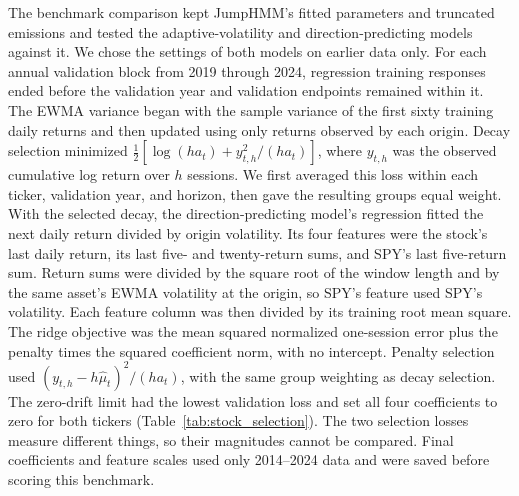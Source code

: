 The benchmark comparison kept JumpHMM's fitted parameters and truncated emissions and tested the adaptive-volatility and direction-predicting models against it. We chose the settings of both models on earlier data only. For each annual validation block from 2019 through 2024, regression training responses ended before the validation year and validation endpoints remained within it. The EWMA variance began with the sample variance of the first sixty training daily returns and then updated using only returns observed by each origin. Decay selection minimized $\tfrac12[\log(h a_t)+y_{t,h}^2/(h a_t)]$, where $y_{t,h}$ was the observed cumulative log return over $h$ sessions. We first averaged this loss within each ticker, validation year, and horizon, then gave the resulting groups equal weight. With the selected decay, the direction-predicting model's regression fitted the next daily return divided by origin volatility. Its four features were the stock's last daily return, its last five- and twenty-return sums, and SPY's last five-return sum. Return sums were divided by the square root of the window length and by the same asset's EWMA volatility at the origin, so SPY's feature used SPY's volatility. Each feature column was then divided by its training root mean square. The ridge objective was the mean squared normalized one-session error plus the penalty times the squared coefficient norm, with no intercept. Penalty selection used $(y_{t,h}-h\widehat\mu_t)^2/(h a_t)$, with the same group weighting as decay selection. The zero-drift limit had the lowest validation loss and set all four coefficients to zero for both tickers (Table~\ref{tab:stock_selection}). The two selection losses measure different things, so their magnitudes cannot be compared. Final coefficients and feature scales used only 2014--2024 data and were saved before scoring this benchmark.

\begin{table}[H]
\centering
\caption{Validation losses used to choose the EWMA decay and ridge penalty of the adaptive-volatility and direction-predicting models. Losses weight ticker, year, and horizon groups equally across the 2019--2024 validation blocks. Lower values are better within each selection task. The selected settings were an EWMA decay of $0.97$ and the zero-drift limit.}\label{tab:stock_selection}

\end{table}

